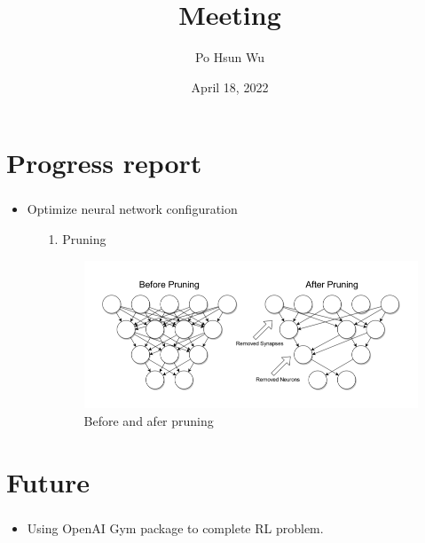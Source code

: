 \documentclass{beamer}
\date{April 18, 2022}
\title{Meeting}
\author{Po Hsun Wu}
\begin{document}
    \maketitle

    \section{Progress report}

    \begin{frame}
        \frametitle{\secname}

        \begin{itemize}
            \item Optimize neural network configuration
            \begin{itemize}
                \item[1.] Pruning
                \begin{figure}
                    \centering
                    \includegraphics[scale=0.3]{Figs/Before_after_pruning.png}
                    \caption{Before and afer pruning}
                \end{figure}
            \end{itemize}
        \end{itemize}
    \end{frame}

    \section{Future}

    \begin{frame}
        \frametitle{\secname}

        \begin{itemize}
            \item Using OpenAI Gym package to complete RL problem.
        \end{itemize}

    \end{frame}
\end{document}
